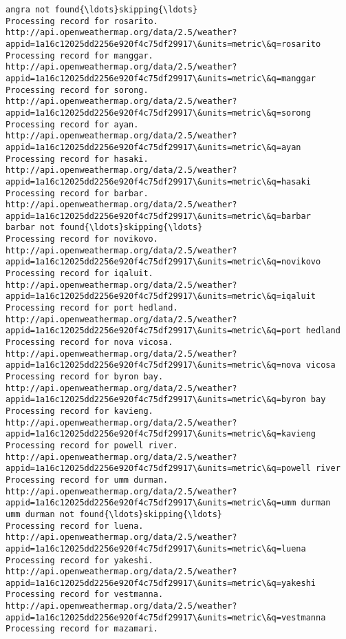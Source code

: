 \documentclass[11pt]{article}
\begin{document}
\begin{Verbatim}[commandchars=\\\{\}]
angra not found{\ldots}skipping{\ldots}
Processing record for rosarito.
http://api.openweathermap.org/data/2.5/weather?appid=1a16c12025dd2256e920f4c75df29917\&units=metric\&q=rosarito
Processing record for manggar.
http://api.openweathermap.org/data/2.5/weather?appid=1a16c12025dd2256e920f4c75df29917\&units=metric\&q=manggar
Processing record for sorong.
http://api.openweathermap.org/data/2.5/weather?appid=1a16c12025dd2256e920f4c75df29917\&units=metric\&q=sorong
Processing record for ayan.
http://api.openweathermap.org/data/2.5/weather?appid=1a16c12025dd2256e920f4c75df29917\&units=metric\&q=ayan
Processing record for hasaki.
http://api.openweathermap.org/data/2.5/weather?appid=1a16c12025dd2256e920f4c75df29917\&units=metric\&q=hasaki
Processing record for barbar.
http://api.openweathermap.org/data/2.5/weather?appid=1a16c12025dd2256e920f4c75df29917\&units=metric\&q=barbar
barbar not found{\ldots}skipping{\ldots}
Processing record for novikovo.
http://api.openweathermap.org/data/2.5/weather?appid=1a16c12025dd2256e920f4c75df29917\&units=metric\&q=novikovo
Processing record for iqaluit.
http://api.openweathermap.org/data/2.5/weather?appid=1a16c12025dd2256e920f4c75df29917\&units=metric\&q=iqaluit
Processing record for port hedland.
http://api.openweathermap.org/data/2.5/weather?appid=1a16c12025dd2256e920f4c75df29917\&units=metric\&q=port hedland
Processing record for nova vicosa.
http://api.openweathermap.org/data/2.5/weather?appid=1a16c12025dd2256e920f4c75df29917\&units=metric\&q=nova vicosa
Processing record for byron bay.
http://api.openweathermap.org/data/2.5/weather?appid=1a16c12025dd2256e920f4c75df29917\&units=metric\&q=byron bay
Processing record for kavieng.
http://api.openweathermap.org/data/2.5/weather?appid=1a16c12025dd2256e920f4c75df29917\&units=metric\&q=kavieng
Processing record for powell river.
http://api.openweathermap.org/data/2.5/weather?appid=1a16c12025dd2256e920f4c75df29917\&units=metric\&q=powell river
Processing record for umm durman.
http://api.openweathermap.org/data/2.5/weather?appid=1a16c12025dd2256e920f4c75df29917\&units=metric\&q=umm durman
umm durman not found{\ldots}skipping{\ldots}
Processing record for luena.
http://api.openweathermap.org/data/2.5/weather?appid=1a16c12025dd2256e920f4c75df29917\&units=metric\&q=luena
Processing record for yakeshi.
http://api.openweathermap.org/data/2.5/weather?appid=1a16c12025dd2256e920f4c75df29917\&units=metric\&q=yakeshi
Processing record for vestmanna.
http://api.openweathermap.org/data/2.5/weather?appid=1a16c12025dd2256e920f4c75df29917\&units=metric\&q=vestmanna
Processing record for mazamari.

\end{Verbatim}
\end{document}
